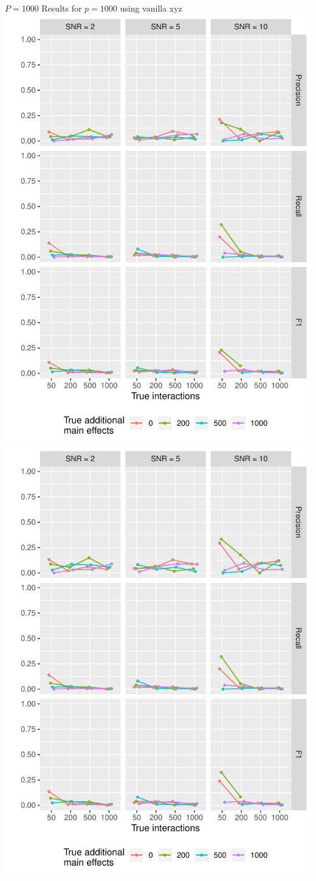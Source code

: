 \documentclass{beamer}
\begin{document}
\begin{frame}{$P = 1000$}
Results for $p=1000$ using vanilla xyz
\includegraphics[width=0.5\linewidth]{"PrecRecF1/PrecRecF1_n10000_tno-vanilla_xyz"}%
\includegraphics[width=0.5\linewidth]{"PrecRecF1/PrecRecF1_n10000_tyes-vanilla_xyz"}
\end{frame}
\end{document}
